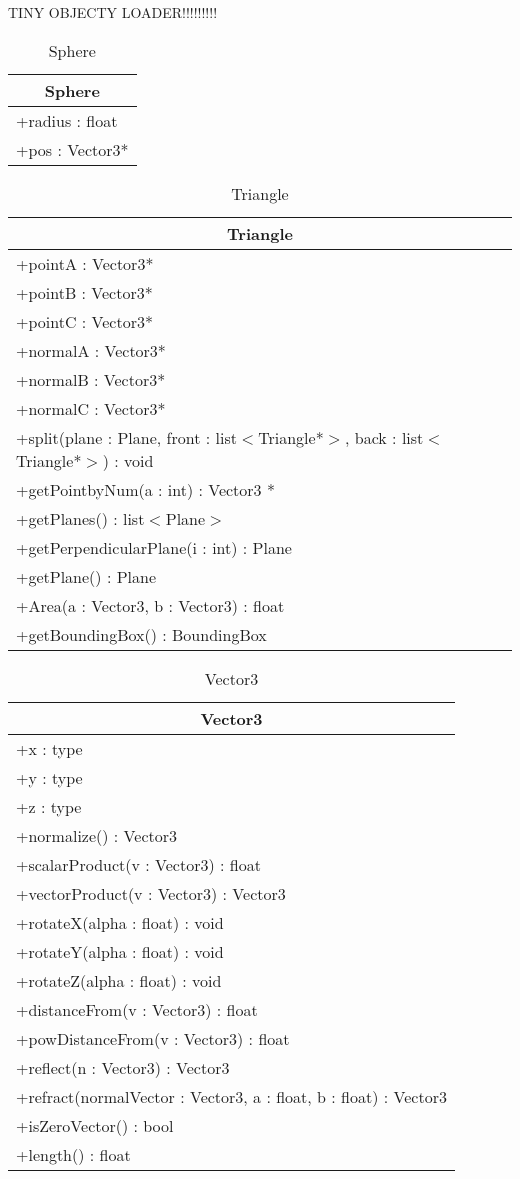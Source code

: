TINY OBJECTY LOADER!!!!!!!!!

\begin{longtable}{|p{16cm}|}
    \caption{Sphere} \label{tab:Sphere} \\ \hline
    \multicolumn{1}{|c|}{Sphere} \\ \hline
    +radius : float \\
    +pos : Vector3* \\
    \hline
\end{longtable}


\begin{longtable}{|p{16cm}|}
    \caption{Triangle} \label{tab:Triangle} \\ \hline
    \multicolumn{1}{|c|}{Triangle} \\ \hline
    +pointA : Vector3* \\
    +pointB : Vector3* \\
    +pointC : Vector3* \\
    +normalA : Vector3* \\
    +normalB : Vector3* \\
    +normalC : Vector3* \\
    \hline
	+split(plane : Plane, front : list$<$Triangle*$>$, back : list$<$Triangle*$>$) : void \\ 
	+getPointbyNum(a : int) : Vector3 * \\
	+getPlanes() : list$<$Plane$>$ \\
	+getPerpendicularPlane(i : int) : Plane \\
	+getPlane() : Plane \\
	+Area(a : Vector3, b : Vector3) : float \\
	+getBoundingBox() : BoundingBox \\
	\hline
\end{longtable}


\begin{longtable}{|p{16cm}|}
    \caption{Vector3} \label{tab:Vector3} \\ \hline
    \multicolumn{1}{|c|}{Vector3} \\ \hline
    +x : type \\
    +y : type \\
    +z : type \\
     \hline
	+normalize() : Vector3 \\ 
	+scalarProduct(v : Vector3) : float \\
	+vectorProduct(v : Vector3) : Vector3 \\
	+rotateX(alpha : float) : void \\
	+rotateY(alpha : float) : void \\
	+rotateZ(alpha : float) : void \\
	+distanceFrom(v : Vector3) : float \\
	+powDistanceFrom(v : Vector3) : float \\
	+reflect(n : Vector3) : Vector3 \\
	+refract(normalVector : Vector3, a : float, b : float) : Vector3 \\
	+isZeroVector() : bool \\
	+length() : float \\
	\hline
\end{longtable}


